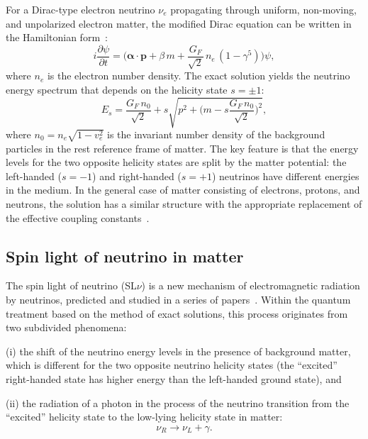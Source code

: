 \documentclass[a4paper,11pt]{article}
\begin{document}
For a Dirac-type electron neutrino $\nu_e$ propagating through uniform, non-moving, and unpolarized electron matter, the modified Dirac equation can be written in the Hamiltonian form~\cite{Studenikin:Ternov:2005PLB}:
\begin{equation}
\label{eq:H_Dirac}
i\frac{\partial \psi}{\partial t} = \Big(\boldsymbol{\alpha}\cdot\mathbf{p} + \beta\,m + \frac{G_F}{\sqrt{2}}\,n_e\,(1-\gamma^5)\Big)\psi,
\end{equation}
where $n_e$ is the electron number density. The exact solution yields the neutrino energy spectrum that depends on the helicity state $s = \pm 1$:
\begin{equation}
\label{eq:E_nu_matter}
E_s = \frac{G_F\,n_0}{\sqrt{2}} + s\sqrt{p^2 + \Big(m - s\frac{G_F\,n_0}{\sqrt{2}}\Big)^2},
\end{equation}
where $n_0 = n_e\sqrt{1-v_e^2}$ is the invariant number density of the background particles in the rest reference frame of matter. The key feature is that the energy levels for the two opposite helicity states are split by the matter potential: the left-handed ($s = -1$) and right-handed ($s = +1$) neutrinos have different energies in the medium. In the general case of matter consisting of electrons, protons, and neutrons, the solution has a similar structure with the appropriate replacement of the effective coupling constants~\cite{Studenikin:Ternov:2005PLB}.

\subsection{Spin light of neutrino in matter}

The spin light of neutrino (SL$\nu$) is a new mechanism of electromagnetic radiation by neutrinos, predicted and studied in a series of papers~\cite{Egorov:2000PLB,Lobanov:Studenikin:2003PLB,Grigoriev:2005PLB,Grigoriev:2012PLB,Grigoriev:2017JCAP}. Within the quantum treatment based on the method of exact solutions, this process originates from two subdivided phenomena:

(i) the shift of the neutrino energy levels in the presence of background matter, which is different for the two opposite neutrino helicity states (the ``excited'' right-handed state has higher energy than the left-handed ground state), and

(ii) the radiation of a photon in the process of the neutrino transition from the ``excited'' helicity state to the low-lying helicity state in matter:
\begin{equation}
\nu_R \to \nu_L + \gamma.
\end{equation}
\end{document}
